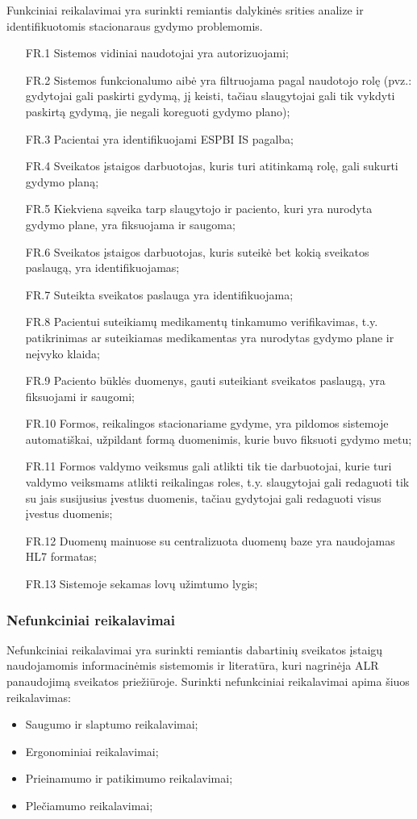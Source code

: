 Funkciniai reikalavimai yra surinkti remiantis dalykinės srities analize ir identifikuotomis stacionaraus gydymo problemomis.
\begin{itemize}
    \item [FR.1] Sistemos vidiniai naudotojai yra autorizuojami;
    \item [FR.2] Sistemos funkcionalumo aibė yra filtruojama pagal naudotojo rolę (pvz.: gydytojai gali paskirti gydymą, jį keisti, tačiau slaugytojai gali tik vykdyti paskirtą gydymą, jie negali koreguoti gydymo plano);
    \item [FR.3] Pacientai yra identifikuojami ESPBI IS pagalba;
    \item [FR.4] Sveikatos įstaigos darbuotojas, kuris turi atitinkamą rolę, gali sukurti gydymo planą;
    \item [FR.5] Kiekviena sąveika tarp slaugytojo ir paciento, kuri yra nurodyta gydymo plane, yra fiksuojama ir saugoma;
    \item [FR.6] Sveikatos įstaigos darbuotojas, kuris suteikė bet kokią sveikatos paslaugą, yra identifikuojamas;
    \item [FR.7] Suteikta sveikatos paslauga yra identifikuojama;
    \item [FR.8] Pacientui suteikiamų medikamentų tinkamumo verifikavimas, t.y. patikrinimas ar suteikiamas medikamentas yra nurodytas gydymo plane ir neįvyko klaida;
    \item [FR.9] Paciento būklės duomenys, gauti suteikiant sveikatos paslaugą, yra fiksuojami ir saugomi;
    \item [FR.10] Formos, reikalingos stacionariame gydyme, yra pildomos sistemoje automatiškai, užpildant formą duomenimis, kurie buvo fiksuoti gydymo metu;
    \item [FR.11] Formos valdymo veiksmus gali atlikti tik tie darbuotojai, kurie turi valdymo veiksmams atlikti reikalingas roles, t.y. slaugytojai gali redaguoti tik su jais susijusius įvestus duomenis, tačiau gydytojai gali redaguoti visus įvestus duomenis;
    \item [FR.12] Duomenų mainuose su centralizuota duomenų baze yra naudojamas HL7 formatas;
    \item [FR.13] Sistemoje sekamas lovų užimtumo lygis;
\end{itemize}

\subsubsection{Nefunkciniai reikalavimai}
Nefunkciniai reikalavimai yra surinkti remiantis dabartinių sveikatos įstaigų naudojamomis informacinėmis sistemomis ir literatūra, kuri nagrinėja ALR panaudojimą sveikatos priežiūroje. Surinkti nefunkciniai reikalavimai apima šiuos reikalavimas:
\begin{itemize}
    \item Saugumo ir slaptumo reikalavimai;
    \item Ergonominiai reikalavimai;
    \item Prieinamumo ir patikimumo reikalavimai;
    \item Plečiamumo reikalavimai;
\end{itemize}

